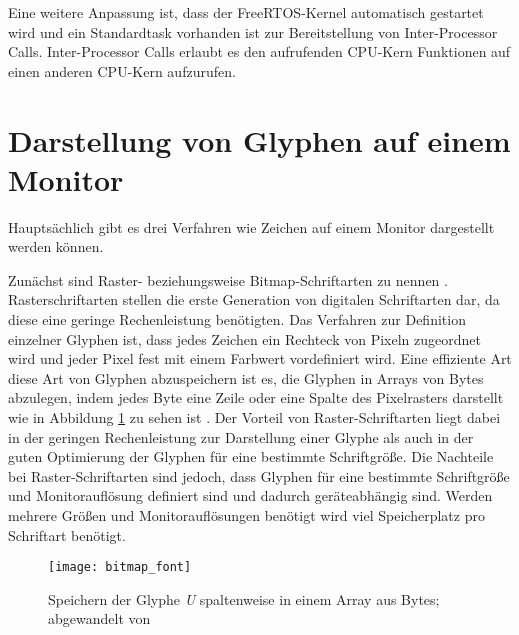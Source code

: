 Eine weitere Anpassung ist, dass der FreeRTOS-Kernel automatisch gestartet wird und ein Standardtask vorhanden ist zur Bereitstellung von Inter-Processor Calls. Inter-Processor Calls erlaubt es den aufrufenden \acs{CPU}-Kern Funktionen auf einen anderen \acs{CPU}-Kern aufzurufen. \cites{espressifIPC}{espressifFreeRTOS}

\section{Darstellung von Glyphen auf einem Monitor}
Hauptsächlich gibt es drei Verfahren wie Zeichen auf einem Monitor dargestellt werden können.

Zunächst sind Raster- beziehungsweise Bitmap-Schriftarten zu nennen \cite{microsoftFonts}. Rasterschriftarten stellen die erste Generation von digitalen Schriftarten dar, da diese eine geringe Rechenleistung benötigten. Das Verfahren zur Definition einzelner Glyphen ist, dass jedes Zeichen ein Rechteck von Pixeln zugeordnet wird und jeder Pixel fest mit einem Farbwert vordefiniert wird. Eine effiziente Art diese Art von Glyphen abzuspeichern ist es, die Glyphen in Arrays von Bytes abzulegen, indem jedes Byte eine Zeile oder eine Spalte des Pixelrasters darstellt wie in Abbildung \ref{fig:bitmapFontArray} zu sehen ist \cite{sansonFont}. Der Vorteil von Raster-Schriftarten liegt dabei in der geringen Rechenleistung zur Darstellung einer Glyphe als auch in der guten Optimierung der Glyphen für eine bestimmte Schriftgröße. Die Nachteile bei Raster-Schriftarten sind jedoch, dass Glyphen für eine bestimmte Schriftgröße und Monitorauflösung definiert sind und dadurch geräteabhängig sind. Werden mehrere Größen und Monitorauflösungen benötigt wird viel Speicherplatz pro Schriftart benötigt. \cites{strizverFont}{microsoftFonts}

\begin{figure}[h]
    \centering
    \texttt{[image: bitmap\_font]}
    \caption{Speichern der Glyphe \textit{U} spaltenweise in einem Array aus Bytes; abgewandelt von \cite{sansonFont}}
    \label{fig:bitmapFontArray}
\end{figure}

